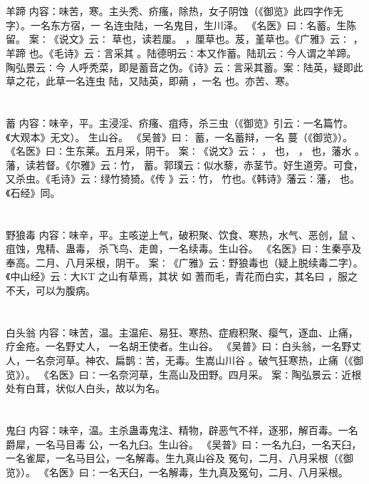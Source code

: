 \documentclass[12pt,UTF8]{ctexbook}
\begin{document}
\section{}羊蹄
内容：味苦，寒。主头秃、疥瘙，除热，女子阴蚀（《御览》此四字作无字）。一名东方宿，一 
名连虫陆，一名鬼目，生川泽。 
《名医》曰∶名蓄。生陈留。 
案∶《说文》云∶ 草也，读若厘。 ，厘草也。芨，堇草也。《广雅》云∶ ，羊蹄 
也。《毛诗》云∶言采其 。陆德明云∶本又作蓄。陆玑云∶今人谓之羊蹄。陶弘景云∶今 
人呼秃菜，即是蓄音之伪。《诗》云∶言采其蓄。案∶陆英，疑即此草之花，此草一名连虫 
陆，又陆英，即蒴 ，一名 也。亦苦、寒。 


\section{}蓄
内容：味辛，平。主浸淫、疥瘙、疽痔，杀三虫（《御览》引云∶一名篇竹。《大观本》无文）。 
生山谷。 
《吴普》曰∶ 蓄，一名蓄辩，一名 蔓（《御览》）。 
《名医》曰∶生东莱。五月采，阴干。 
案∶《说文》云∶ ， 也， ， 也，藩水 。藩，读若督。《尔雅》云∶竹， 
蓄。郭璞云∶似水藜，赤茎节。好生道旁。可食，又杀虫。《毛诗》云∶绿竹猗猗。《传 
》云∶竹， 竹也。《韩诗》藩云∶藩， 也。《石经》同。 


\section{}野狼毒
内容：味辛，平。主咳逆上气，破积聚、饮食、寒热，水气、恶创，鼠 、疽蚀，鬼精、蛊毒， 
杀飞鸟、走兽，一名续毒。生山谷。 
《名医》曰∶生秦亭及奉高。二月、八月采根，阴干。 
案∶《广雅》云∶野狼毒也（疑上脱续毒二字）。《中山经》云∶大KT 之山有草焉，其状 
如 
蓍而毛，青花而白实，其名曰 ，服之不夭，可以为腹病。 


\section{}白头翁
内容：味苦，温。主温疟、易狂、寒热、症瘕积聚、瘿气，逐血、止痛，疗金疮。一名野丈人， 
一名胡王使者。生山谷。 
《吴普》曰∶白头翁，一名野丈人，一名奈河草。神农、扁鹊∶苦，无毒。生嵩山川谷 
。破气狂寒热，止痛（《御览》）。 
《名医》曰∶一名奈河草，生高山及田野。四月采。 
案∶陶弘景云∶近根处有白茸，状似人白头，故以为名。 


\section{}鬼臼
内容：味辛，温。主杀蛊毒鬼注、精物，辟恶气不祥，逐邪，解百毒。一名爵犀，一名马目毒 
公，一名九臼。生山谷。 
《吴普》曰∶一名九臼，一名天臼，一名雀犀，一名马目公，一名解毒。生九真山谷及 
冤句，二月、八月采根（《御览》）。 
《名医》曰∶一名天臼，一名解毒，生九真及冤句，二月、八月采根。 
\end{document}
